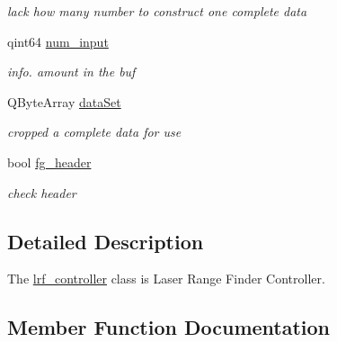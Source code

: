 \begin{DoxyCompactItemize}
\begin{DoxyCompactList}\small\item\em lack how many number to construct one complete data \end{DoxyCompactList}\item 
\hypertarget{classlrf__controller_ade46827d5b722e12f5c930bac0f14578}{}qint64 \hyperlink{classlrf__controller_ade46827d5b722e12f5c930bac0f14578}{num\+\_\+input}\label{classlrf__controller_ade46827d5b722e12f5c930bac0f14578}

\begin{DoxyCompactList}\small\item\em info. amount in the buf \end{DoxyCompactList}\item 
\hypertarget{classlrf__controller_a4656d6056dd73f094a33fecfb820503a}{}Q\+Byte\+Array \hyperlink{classlrf__controller_a4656d6056dd73f094a33fecfb820503a}{data\+Set}\label{classlrf__controller_a4656d6056dd73f094a33fecfb820503a}

\begin{DoxyCompactList}\small\item\em cropped a complete data for use \end{DoxyCompactList}\item 
\hypertarget{classlrf__controller_ab2c456ff3c20ee7664698faf29882e5e}{}bool \hyperlink{classlrf__controller_ab2c456ff3c20ee7664698faf29882e5e}{fg\+\_\+header}\label{classlrf__controller_ab2c456ff3c20ee7664698faf29882e5e}

\begin{DoxyCompactList}\small\item\em check header \end{DoxyCompactList}\end{DoxyCompactItemize}


\subsection{Detailed Description}
The \hyperlink{classlrf__controller}{lrf\+\_\+controller} class is Laser Range Finder Controller. 

\subsection{Member Function Documentation}
\hypertarget{classlrf__controller_a864a9f00f905ed2f24d2dc8b12566e4a}{}
